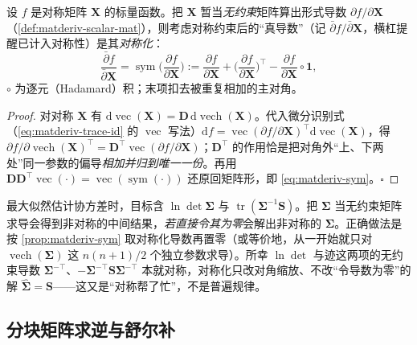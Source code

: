 \begin{proposition}\label{prop:matderiv-sym}
设 $f$ 是对称矩阵 $\mathbf{X}$ 的标量函数。把 $\mathbf{X}$ 暂当\emph{无约束}矩阵算出形式导数 $\partial f/\partial\mathbf{X}$（\cref{def:matderiv-scalar-mat}），则考虑对称约束后的“真导数”（记 $\bar{\partial} f/\bar{\partial}\mathbf{X}$，横杠提醒已计入对称性）是其\emph{对称化}：
\begin{equation}
  \frac{\bar{\partial} f}{\bar{\partial}\mathbf{X}}
  =\operatorname{sym}\!\Big(\frac{\partial f}{\partial\mathbf{X}}\Big)
  :=\frac{\partial f}{\partial\mathbf{X}}+\Big(\frac{\partial f}{\partial\mathbf{X}}\Big)^{\!\top}-\frac{\partial f}{\partial\mathbf{X}}\circ\mathbf{1},
  \label{eq:matderiv-sym}
\end{equation}
$\circ$ 为逐元（Hadamard）积；末项扣去被重复相加的主对角。
\end{proposition}
\begin{proof}
对对称 $\mathbf{X}$ 有 $\mathrm{d}\operatorname{vec}(\mathbf{X})=\mathbf{D}\,\mathrm{d}\operatorname{vech}(\mathbf{X})$。代入微分识别式（\cref{eq:matderiv-trace-id} 的 $\operatorname{vec}$ 写法）$\mathrm{d}f=\operatorname{vec}(\partial f/\partial\mathbf{X})^\top\mathrm{d}\operatorname{vec}(\mathbf{X})$，得 $\partial f/\partial\operatorname{vech}(\mathbf{X})^\top=\mathbf{D}^\top\operatorname{vec}(\partial f/\partial\mathbf{X})$；$\mathbf{D}^\top$ 的作用恰是把对角外“上、下两处”同一参数的偏导\emph{相加并归到唯一一份}。再用 $\mathbf{D}\mathbf{D}^\top\operatorname{vec}(\cdot)=\operatorname{vec}(\operatorname{sym}(\cdot))$ 还原回矩阵形，即 \cref{eq:matderiv-sym}。\hfill$\square$
\end{proof}

\begin{pitfall}[对协方差求导漏掉对称化]
最大似然估计协方差时，目标含 $\ln\det\boldsymbol{\Sigma}$ 与 $\operatorname{tr}(\boldsymbol{\Sigma}^{-1}\mathbf{S})$。把 $\boldsymbol{\Sigma}$ 当无约束矩阵求导会得到非对称的中间结果，\emph{若直接令其为零}会解出非对称的 $\boldsymbol{\Sigma}$。正确做法是按 \cref{prop:matderiv-sym} 取对称化导数再置零（或等价地，从一开始就只对 $\operatorname{vech}(\boldsymbol{\Sigma})$ 这 $n(n+1)/2$ 个独立参数求导）。所幸 $\ln\det$ 与迹这两项的无约束导数 $\boldsymbol{\Sigma}^{-\top}$、$-\boldsymbol{\Sigma}^{-\top}\mathbf{S}\boldsymbol{\Sigma}^{-\top}$ 本就对称，对称化只改对角缩放、不改“令导数为零”的解 $\hat{\boldsymbol{\Sigma}}=\mathbf{S}$——这又是“对称帮了忙”，不是普遍规律。
\end{pitfall}

\subsection{分块矩阵求逆与舒尔补}
\label{sec:matderiv-block-inv}

